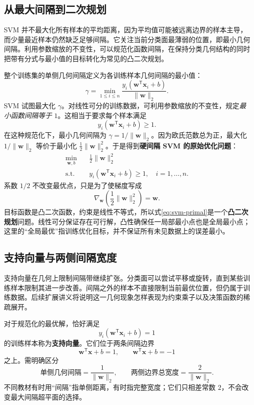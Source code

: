 \subsection{从最大间隔到二次规划}

SVM 并不最大化所有样本的平均距离，因为平均值可能被远离边界的样本主导，而少量最近样本仍然缺乏足够间隔。它关注当前分类面最薄弱的位置，即最小几何间隔。利用参数缩放的不变性，可以规范化函数间隔，在保持分类几何结构的同时把带有分式与最小值的目标转化为常见的凸二次规划。

整个训练集的单侧几何间隔定义为各训练样本几何间隔的最小值：
\[
\gamma=\min_{1\leq i\leq n}
\frac{y_i(\boldsymbol w^{\mathsf T}\boldsymbol x_i+b)}
{\|\boldsymbol w\|_2}.
\]
SVM 试图最大化 $\gamma$。对线性可分的训练数据，可利用参数缩放的不变性，规定\emph{最小函数间隔等于 $1$}。这相当于要求每个样本满足
\[
y_i(\boldsymbol w^{\mathsf T}\boldsymbol x_i+b)\geq1.
\]
在这种规范化下，最小几何间隔为 $\gamma=1/\|\boldsymbol w\|_2$。因为欧氏范数总为正，最大化 $1/\|\boldsymbol w\|_2$ 等价于最小化 $\frac12\|\boldsymbol w\|_2^2$。于是得到\textbf{硬间隔 SVM 的原始优化问题}：
\begin{equation}\label{eq:svm-primal}
\begin{aligned}
\min_{\boldsymbol w,b}\quad&
\frac12\|\boldsymbol w\|_2^2\\
\text{s.t.}\quad&
y_i(\boldsymbol w^{\mathsf T}\boldsymbol x_i+b)\geq1,
\quad i=1,\ldots,n.
\end{aligned}
\end{equation}
系数 $1/2$ 不改变最优点，只是为了使梯度写成
\[
\nabla_{\boldsymbol w}\left(\frac12\|\boldsymbol w\|_2^2\right)
=\boldsymbol w.
\]
目标函数是凸二次函数，约束是线性不等式，所以式\eqref{eq:svm-primal}是一个\textbf{凸二次规划}问题\cite{liu2020}。线性可分保证存在可行解，凸性确保任一局部最小点也是全局最小点；这里的“全局最优”指训练优化目标，并不保证所有未见数据上的误差最小。

\subsection{支持向量与两侧间隔宽度}

支持向量在几何上限制间隔带继续扩张。分类面可以尝试平移或旋转，直到某些训练样本限制其进一步改善。间隔之外的样本不直接限制当前最优位置，但仍属于训练数据。后续扩展讲义将说明这一几何现象怎样表现为约束乘子以及决策函数的稀疏展开。

对于规范化的最优解，恰好满足
\begin{equation}\label{eq:svm-support}
y_i(\boldsymbol w^{\mathsf T}\boldsymbol x_i+b)=1
\end{equation}
的训练样本称为\textbf{支持向量}。它们位于两条间隔边界
\[
\boldsymbol w^{\mathsf T}\boldsymbol x+b=1,\qquad
\boldsymbol w^{\mathsf T}\boldsymbol x+b=-1
\]
之上。需明确区分
\begin{equation}\label{eq:svm-width}
\text{单侧几何间隔}=\frac1{\|\boldsymbol w\|_2},
\qquad
\text{两侧边界总宽度}=\frac2{\|\boldsymbol w\|_2}.
\end{equation}
不同教材有时用“间隔”指单侧距离，有时指完整宽度；它们只相差常数 $2$，不会改变最大间隔超平面的选择\cite[第9章]{james2023}。


